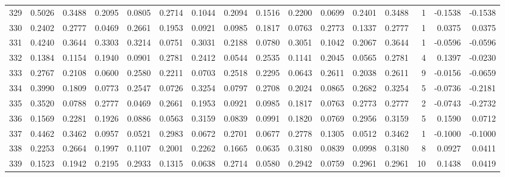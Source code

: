\begin{tabular}{lrrrrrrrrrrrrrrr}
329 &      0.5026 &  0.3488 &  0.2095 &  0.0805 &  0.2714 &  0.1044 &  0.2094 &  0.1516 &  0.2200 &  0.0699 &   0.2401 &     0.3488 &      1 &                   -0.1538 &                    -0.1538 \\
330 &      0.2402 &  0.2777 &  0.0469 &  0.2661 &  0.1953 &  0.0921 &  0.0985 &  0.1817 &  0.0763 &  0.2773 &   0.1337 &     0.2777 &      1 &                    0.0375 &                     0.0375 \\
331 &      0.4240 &  0.3644 &  0.3303 &  0.3214 &  0.0751 &  0.3031 &  0.2188 &  0.0780 &  0.3051 &  0.1042 &   0.2067 &     0.3644 &      1 &                   -0.0596 &                    -0.0596 \\
332 &      0.1384 &  0.1154 &  0.1940 &  0.0901 &  0.2781 &  0.2412 &  0.0544 &  0.2535 &  0.1141 &  0.2045 &   0.0565 &     0.2781 &      4 &                    0.1397 &                    -0.0230 \\
333 &      0.2767 &  0.2108 &  0.0600 &  0.2580 &  0.2211 &  0.0703 &  0.2518 &  0.2295 &  0.0643 &  0.2611 &   0.2038 &     0.2611 &      9 &                   -0.0156 &                    -0.0659 \\
334 &      0.3990 &  0.1809 &  0.0773 &  0.2547 &  0.0726 &  0.3254 &  0.0797 &  0.2708 &  0.2024 &  0.0865 &   0.2682 &     0.3254 &      5 &                   -0.0736 &                    -0.2181 \\
335 &      0.3520 &  0.0788 &  0.2777 &  0.0469 &  0.2661 &  0.1953 &  0.0921 &  0.0985 &  0.1817 &  0.0763 &   0.2773 &     0.2777 &      2 &                   -0.0743 &                    -0.2732 \\
336 &      0.1569 &  0.2281 &  0.1926 &  0.0886 &  0.0563 &  0.3159 &  0.0839 &  0.0991 &  0.1820 &  0.0769 &   0.2956 &     0.3159 &      5 &                    0.1590 &                     0.0712 \\
337 &      0.4462 &  0.3462 &  0.0957 &  0.0521 &  0.2983 &  0.0672 &  0.2701 &  0.0677 &  0.2778 &  0.1305 &   0.0512 &     0.3462 &      1 &                   -0.1000 &                    -0.1000 \\
338 &      0.2253 &  0.2664 &  0.1997 &  0.1107 &  0.2001 &  0.2262 &  0.1665 &  0.0635 &  0.3180 &  0.0839 &   0.0998 &     0.3180 &      8 &                    0.0927 &                     0.0411 \\
339 &      0.1523 &  0.1942 &  0.2195 &  0.2933 &  0.1315 &  0.0638 &  0.2714 &  0.0580 &  0.2942 &  0.0759 &   0.2961 &     0.2961 &     10 &                    0.1438 &                     0.0419 \\

\end{tabular}
